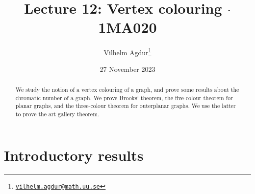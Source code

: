 \documentclass[nobib]{tufte-handout}
\title{Lecture 12: Vertex colouring $\cdot$ 1MA020}
\author[Vilhelm Agdur]{Vilhelm Agdur\thanks{\href{mailto:vilhelm.agdur@math.uu.se}{\nolinkurl{vilhelm.agdur@math.uu.se}}}}
\date{27 November 2023}
\begin{document}
\maketitle%

\begin{abstract}
\noindent
We study the notion of a vertex colouring of a graph, and prove some results about the chromatic number of a graph. We prove Brooks' theorem, the five-colour theorem for planar graphs, and the three-colour theorem for outerplanar graphs. We use the latter to prove the art gallery theorem.
\end{abstract}

\section{Introductory results}
\end{document}
